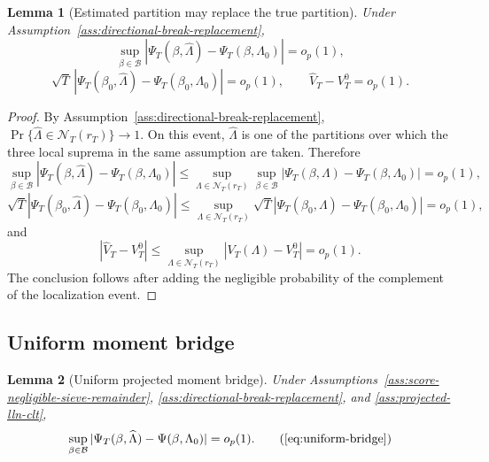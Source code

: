 \documentclass[12pt]{article}
\numberwithin{equation}{section}
\newtheorem{lemma}{Lemma}
\theoremstyle{definition}
\newcommand{\op}{o_p}
\begin{document}
\begin{lemma}[Estimated partition may replace the true partition]
\label{lem:part2-break-replacement}
Under Assumption~\ref{ass:directional-break-replacement},
\[
    \sup_{\beta\in\mathcal B}
    |\Psi_T(\beta,\widehat\Lambda)-\Psi_T(\beta,\Lambda_0)|=\op(1),
\]
\[
    \sqrt T\,
    |\Psi_T(\beta_0,\widehat\Lambda)-\Psi_T(\beta_0,\Lambda_0)|=\op(1),
    \qquad
    \widehat V_T-V_T^0=\op(1).
\]
\end{lemma}

\begin{proof}
By Assumption~\ref{ass:directional-break-replacement},
\(\Pr\{\widehat\Lambda\in\mathcal N_T(r_T)\}\to1\). On this event,
\(\widehat\Lambda\) is one of the partitions over which the three local
suprema in the same assumption are taken. Therefore
\[
    \sup_{\beta\in\mathcal B}
    |\Psi_T(\beta,\widehat\Lambda)-\Psi_T(\beta,\Lambda_0)|
    \le
    \sup_{\Lambda\in\mathcal N_T(r_T)}\sup_{\beta\in\mathcal B}
    |\Psi_T(\beta,\Lambda)-\Psi_T(\beta,\Lambda_0)|=\op(1),
\]
\[
    \sqrt T|\Psi_T(\beta_0,\widehat\Lambda)-\Psi_T(\beta_0,\Lambda_0)|
    \le
    \sup_{\Lambda\in\mathcal N_T(r_T)}
    \sqrt T|\Psi_T(\beta_0,\Lambda)-\Psi_T(\beta_0,\Lambda_0)|=\op(1),
\]
and
\[
    |\widehat V_T-V_T^0|
    \le
    \sup_{\Lambda\in\mathcal N_T(r_T)}|V_T(\Lambda)-V_T^0|=\op(1).
\]
The conclusion follows after adding the negligible probability of the complement
of the localization event.
\end{proof}

\subsection{Uniform moment bridge}

\begin{lemma}[Uniform projected moment bridge]
\label{lem:part2-uniform-bridge}
Under Assumptions~\ref{ass:score-negligible-sieve-remainder},
\ref{ass:directional-break-replacement}, and \ref{ass:projected-lln-clt},
\begin{equation}
    \sup_{\beta\in\mathcal B}
    |\Psi_T(\beta,\widehat\Lambda)-\Psi(\beta,\Lambda_0)|=\op(1).
    \tag{\ref{eq:uniform-bridge}}
\end{equation}
\end{lemma}
\end{document}
